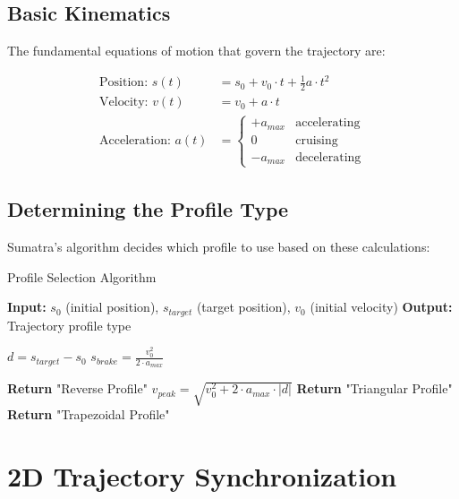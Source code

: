 \documentclass[12pt,a4paper]{article}
\begin{document}
\subsection{Basic Kinematics}

The fundamental equations of motion that govern the trajectory are:

\begin{align}
    \text{Position: } s(t) &= s_0 + v_0 \cdot t + \frac{1}{2} a \cdot t^2 \\
    \text{Velocity: } v(t) &= v_0 + a \cdot t \\
    \text{Acceleration: } a(t) &= \begin{cases}
        +a_{max} & \text{accelerating} \\
        0 & \text{cruising} \\
        -a_{max} & \text{decelerating}
    \end{cases}
\end{align}

\subsection{Determining the Profile Type}

Sumatra's algorithm decides which profile to use based on these calculations:

\begin{algorithm}
\caption{Profile Selection Algorithm}
\begin{algorithmic}
\STATE \textbf{Input:} $s_0$ (initial position), $s_{target}$ (target position), $v_0$ (initial velocity)
\STATE \textbf{Output:} Trajectory profile type

\STATE $d = s_{target} - s_0$ 
\STATE $s_{brake} = \frac{v_0^2}{2 \cdot a_{max}}$ 

    \STATE \textbf{Return} "Reverse Profile" 
\ELSE
    \STATE $v_{peak} = \sqrt{v_0^2 + 2 \cdot a_{max} \cdot |d|}$
        \STATE \textbf{Return} "Triangular Profile"
    \ELSE
        \STATE \textbf{Return} "Trapezoidal Profile"
    \ENDIF
\ENDIF
\end{algorithmic}
\end{algorithm}

\section{2D Trajectory Synchronization}
\end{document}

